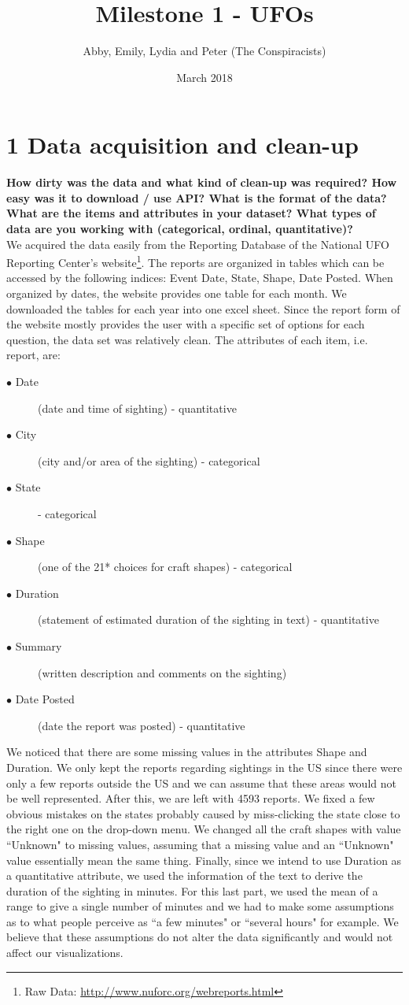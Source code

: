 \documentclass{neu_handout}
\title{Milestone 1 - UFOs}
\author{Abby, Emily, Lydia and Peter (The Conspiracists)}
\date{March 2018}
\begin{document}
\section*{1 Data acquisition and clean-up}

\textbf{How dirty was the data and what kind of clean-up was required? How
easy was it to download / use API? What is the format of the data? What are the
items and attributes in your dataset? What types of data are you working with
(categorical, ordinal, quantitative)?}\\

We acquired the data easily from the Reporting Database of the National UFO Reporting Center's website\footnote{Raw Data: \url{http://www.nuforc.org/webreports.html}}. The reports are organized in tables which can be accessed by the following indices: Event Date, State, Shape, Date Posted. When organized by dates, the website provides one table for each month. We downloaded the tables for each year into one excel sheet. Since the report form of the website mostly provides the user with a specific set of options for each question, the data set was relatively clean. The attributes of each item, i.e. report, are:

\begin{description}
  \item[$\bullet$ Date] (date and time of sighting) - quantitative
  \item[$\bullet$ City] (city and/or area of the sighting) - categorical
  \item[$\bullet$ State] - categorical
  \item[$\bullet$ Shape] (one of the 21* choices for craft shapes) - categorical
  \item[$\bullet$ Duration] (statement of estimated duration of the sighting in text) - quantitative
  \item[$\bullet$ Summary] (written description and comments on the sighting)
  \item[$\bullet$ Date Posted] (date the report was posted) - quantitative
\end{description}

We noticed that there are some missing values in the attributes Shape and Duration. We only kept the reports regarding sightings in the US since there were only a few reports outside the US and we can assume that these areas would not be well represented. After this, we are left with 4593 reports. We fixed a few obvious mistakes on the states probably caused by miss-clicking the state close to the right one on the drop-down menu. We changed all the craft shapes with value ``Unknown" to missing values, assuming that a missing value and an ``Unknown" value essentially mean the same thing. Finally, since we intend to use Duration as a quantitative attribute, we used the information of the text to derive the duration of the sighting in minutes. For this last part, we used the mean of a range to give a single number of minutes and we had to make some assumptions as to what people perceive as ``a few minutes" or ``several hours" for example. We believe that these assumptions do not alter the data significantly and would not affect our visualizations.
\end{document}

